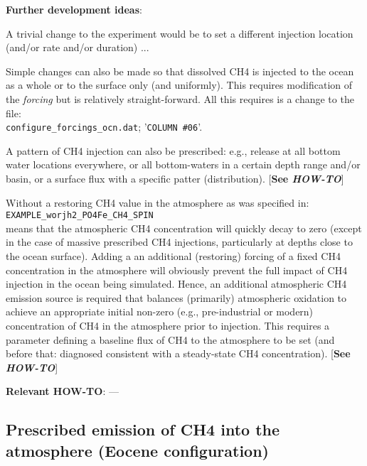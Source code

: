 \documentclass[10pt,twoside]{article}
\begin{document}
\noindent \textbf{Further development ideas}:
\begin{compactenum}
	\item A trivial change to the experiment would be to set a different injection location (and/or rate and/or duration) ...
		\item Simple changes can also be made so that dissolved CH4 is injected to the ocean as a whole or to the surface only (and uniformly). This requires modification of the \textit{forcing} but is relatively straight-forward. All this requires is a change to the file:
		\\ \texttt{configure\_forcings\_ocn.dat}; '\texttt{COLUMN \#06}'.
				\item A pattern of CH4 injection can also be prescribed: e.g., release at all bottom water locations everywhere, or all bottom-waters in a certain depth range and/or basin, or a surface flux with a specific patter (distribution). [\textbf{See \textit{HOW-TO}}]
				\item Without a restoring CH4 value in the atmosphere as was specified in:
				\\\texttt{EXAMPLE\_worjh2\_PO4Fe\_CH4\_SPIN}
				\\means that the atmospheric CH4 concentration will quickly decay to zero (except in the case of massive prescribed CH4 injections, particularly at depths close to the ocean surface). Adding a an additional (restoring) forcing of a fixed CH4 concentration in the atmosphere will obviously prevent the full impact of CH4 injection in the ocean being simulated. Hence, an additional atmospheric CH4 emission source is required that balances (primarily) atmospheric oxidation to achieve an appropriate initial non-zero (e.g., pre-industrial or modern) concentration of CH4 in the atmosphere prior to injection. This requires a parameter defining a baseline flux of CH4 to the atmosphere to be set (and before that: diagnosed consistent with a steady-state CH4 concentration). [\textbf{See \textit{HOW-TO}}]
\end{compactenum}

\noindent \textbf{Relevant HOW-TO}: ---



\subsection{Prescribed emission of CH4 into the atmosphere (Eocene configuration)}\label{EXAMPLE_p0055c_PO4_CH4EMISSION}
\end{document}
